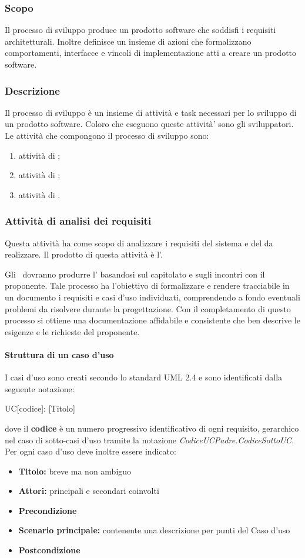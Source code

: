 \documentclass[12pt,a4paper]{article}
\begin{document}
\subsubsection{Scopo}
Il processo di sviluppo produce un prodotto software che soddisfi i requisiti architetturali. Inoltre definisce un insieme di azioni che formalizzano comportamenti, interfacce e vincoli di implementazione atti a creare un prodotto software.

\subsubsection{Descrizione}
Il processo di sviluppo è un insieme di attività e task necessari per lo sviluppo di un prodotto software. Coloro che eseguono queste attività' sono gli sviluppatori. Le attività che compongono il processo di sviluppo sono:
\begin{enumerate}
	\item attività di \FA;
	\item attività di \FPA;
	\item attività di \FPDC.
\end{enumerate}

\subsubsection{Attività di analisi dei requisiti}
Questa attività ha come scopo di analizzare i requisiti del sistema e del  da realizzare. Il prodotto di questa attività è l'\AdR.

Gli \ANpl\ dovranno produrre l'\AdR{} basandosi sul capitolato e sugli incontri con il proponente. Tale processo ha l'obiettivo di formalizzare e rendere tracciabile in un documento i requisiti e casi d'uso individuati, comprendendo a fondo eventuali problemi da risolvere durante la progettazione. Con il completamento di questo processo si ottiene una documentazione affidabile e consistente che ben descrive le esigenze e le richieste del proponente.

\paragraph{Struttura di un caso d'uso}
I casi d'uso sono creati secondo lo standard UML 2.4 e sono identificati dalla seguente notazione:
\begin{center}
	UC[codice]: [Titolo]
\end{center}
dove il \textbf{codice} è un numero progressivo identificativo di ogni requisito, gerarchico nel  caso di sotto-casi d'uso tramite la notazione \textit{CodiceUCPadre.CodiceSottoUC}. Per ogni caso d'uso deve inoltre essere indicato:
\begin{itemize}
	\item \textbf{Titolo:} breve ma non ambiguo
	\item \textbf{Attori:} principali e secondari coinvolti
	\item \textbf{Precondizione}
	\item \textbf{Scenario principale:} contenente una descrizione per punti del Caso d'uso
	\item \textbf{Postcondizione}
\end{itemize}
\end{document}

